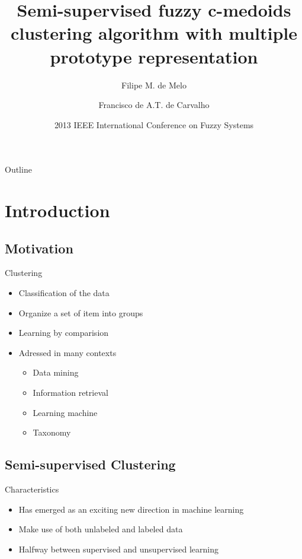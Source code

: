 \documentclass{beamer}
\title[Semi-supervised fuzzy c-medoids clustering algorithm]{Semi-supervised fuzzy c-medoids clustering algorithm with multiple prototype representation}
\author{
	Filipe M. de Melo\inst{1} \and Francisco de A.T. de Carvalho\inst{1}
}
\institute{
	Center of Informatics\\
	Federal University of Pernambuco
}
\date[fuzzIEEE 2013]{2013 IEEE International Conference on Fuzzy Systems}
\begin{document}
\begin{frame}
	\titlepage
\end{frame}

\begin{frame}{Outline}
	\tableofcontents
\end{frame}

\section{Introduction}

\subsection{Motivation}

\begin{frame}{Clustering}
	\begin{itemize}
	\item{Classification of the data}
	\item{Organize a set of item into groups}
	\item{Learning by comparision}
	\item{Adressed in many contexts}
		\begin{itemize}
		\item{Data mining}
		\item{Information retrieval}
		\item{Learning machine}
		\item{Taxonomy}
		\end{itemize}
	\end{itemize}
\end{frame}

\subsection{Semi-supervised Clustering}

\begin{frame}{Characteristics}
	\begin{itemize}
	\item{Has emerged as an exciting new direction in machine learning}
	\item{Make use of both unlabeled and labeled data}
	\item{Halfway between supervised and unsupervised learning}
	\end{itemize}
\end{frame}
\end{document}
